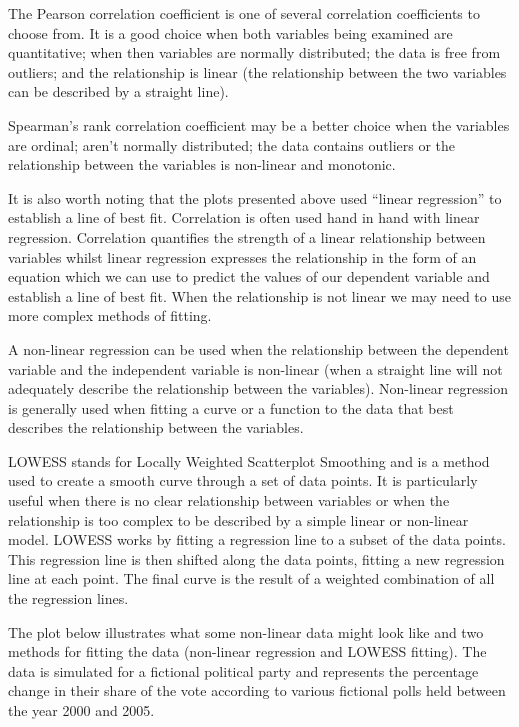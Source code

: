 \documentclass[
]{book}
\begin{document}
The Pearson correlation coefficient is one of several correlation coefficients to choose from. It is a good choice when both variables being examined are quantitative; when then variables are normally distributed; the data is free from outliers; and the relationship is linear (the relationship between the two variables can be described by a straight line).

Spearman's rank correlation coefficient may be a better choice when the variables are ordinal; aren't normally distributed; the data contains outliers or the relationship between the variables is non-linear and monotonic.

It is also worth noting that the plots presented above used ``linear regression'' to establish a line of best fit. Correlation is often used hand in hand with linear regression. Correlation quantifies the strength of a linear relationship between variables whilst linear regression expresses the relationship in the form of an equation which we can use to predict the values of our dependent variable and establish a line of best fit. When the relationship is not linear we may need to use more complex methods of fitting.

A non-linear regression can be used when the relationship between the dependent variable and the independent variable is non-linear (when a straight line will not adequately describe the relationship between the variables). Non-linear regression is generally used when fitting a curve or a function to the data that best describes the relationship between the variables.

LOWESS stands for Locally Weighted Scatterplot Smoothing and is a method used to create a smooth curve through a set of data points. It is particularly useful when there is no clear relationship between variables or when the relationship is too complex to be described by a simple linear or non-linear model. LOWESS works by fitting a regression line to a subset of the data points. This regression line is then shifted along the data points, fitting a new regression line at each point. The final curve is the result of a weighted combination of all the regression lines.

The plot below illustrates what some non-linear data might look like and two methods for fitting the data (non-linear regression and LOWESS fitting). The data is simulated for a fictional political party and represents the percentage change in their share of the vote according to various fictional polls held between the year 2000 and 2005.
\end{document}
